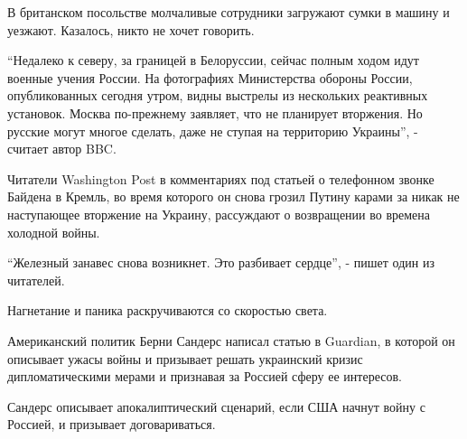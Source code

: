 \begin{multicols}{3}
В британском посольстве молчаливые сотрудники загружают сумки в машину и
уезжают. Казалось, никто не хочет говорить.

\enquote{Недалеко к северу, за границей в Белоруссии, сейчас полным ходом идут военные
учения России. На фотографиях Министерства обороны России, опубликованных
сегодня утром, видны выстрелы из нескольких реактивных установок. Москва
по-прежнему заявляет, что не планирует вторжения. Но русские могут многое
сделать, даже не ступая на территорию Украины}, - считает автор BBC.


Читатели Washington Post в комментариях под статьей о телефонном звонке Байдена
в Кремль, во время которого он снова грозил Путину карами за никак не
наступающее вторжение на Украину, рассуждают о возвращении во времена холодной
войны.

\enquote{Железный занавес снова возникнет. Это разбивает сердце}, - пишет один из читателей.


Нагнетание и паника раскручиваются со скоростью света.

Американский политик Берни Сандерс написал статью в Guardian, в которой он
описывает ужасы войны и призывает решать украинский кризис дипломатическими
мерами и признавая за Россией сферу ее интересов.

Сандерс описывает апокалиптический сценарий, если США начнут войну с Россией, и
призывает договариваться.


\end{multicols}
